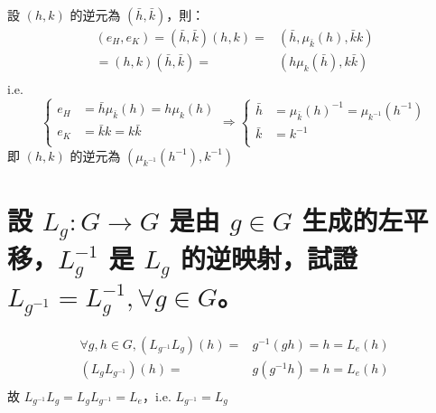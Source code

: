 \documentclass{article}
\begin{document}
\begin{framed}
  設 $\left( {h,k} \right)$ 的逆元為 $\left( {\bar{h},\bar{k}} \right)$，則：
  $$\begin{aligned}
      \left( {{e_H},{e_K}} \right) = \left( {\bar h,\bar k} \right)\left( {h,k} \right) = & \left( {\bar h,{\mu _{\bar k}}\left( h \right),\bar kk} \right) \\
      = \left( {h,k} \right)\left( {\bar h,\bar k} \right) =                              & \left( {h{\mu _k}\left( {\bar h} \right),k\bar k} \right)       \\
    \end{aligned} $$
  i.e.
  $$\left\{ \begin{aligned}
      {e_H} & = \bar h{\mu _{\bar k}}\left( h \right) = h{\mu _k}\left( h \right) \\
      {e_K} & = \bar kk = k\bar k                                                 \\
    \end{aligned}  \right. \Rightarrow \left\{ \begin{aligned}
      \bar h & = {\mu _{\bar k}}{\left( h \right)^{ - 1}} = {\mu _{{k^{ - 1}}}}\left( {{h^{ - 1}}} \right) \\
      \bar k & = {k^{ - 1}}                                                                                \\
    \end{aligned}  \right.$$
  即  $\left( {h,k} \right)$ 的逆元為 $\left( {{\mu _{{k^{ - 1}}}}\left( {{h^{ - 1}}} \right),{k^{ - 1}}} \right)$
\end{framed}

\section{設 $L_g:G\to G$ 是由 $g\in G$ 生成的左平移，$L_g^{-1}$ 是 $L_g$ 的逆映射，試證 $L_{g^{-1}}=L_g^{-1},\forall g\in G$。}
\begin{framed}
  $$\begin{aligned}
      \forall g,h \in G,\left( {{L_{{g^{ - 1}}}}{L_g}} \right)\left( h \right) = & {g^{ - 1}}\left( {gh} \right) = h = {L_e}\left( h \right) \\
      \left( {{L_g}{L_{{g^{ - 1}}}}} \right)\left( h \right) =                   & g\left( {{g^{ - 1}}h} \right) = h = {L_e}\left( h \right) \\
    \end{aligned} $$
  故 ${L_{{g^{ - 1}}}}{L_g} = {L_g}{L_{{g^{ - 1}}}} = {L_e}$，i.e. ${L_{{g^{ - 1}}}}={L_g}$
\end{framed}
\end{document}
